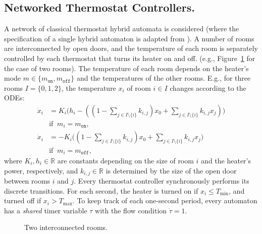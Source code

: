 \subsection{Networked Thermostat Controllers.}

A network of classical thermostat hybrid automata is considered 
(where the specification of a single hybrid automaton is adapted from \cite{henzinger2000theory}). 
A number of rooms are interconnected by open doors,
and the temperature of each room is separately controlled by each thermostat
that turns its heater on and off.
(e.g., Figure~\ref{fig:adj-rooms}  for the case of two rooms).
The temperature of each room depends on
the heater's mode $m \in \{m_\texttt{on}, m_\texttt{off}\}$  and the temperatures of the other rooms.
E.g., for three rooms $I = \{0,1,2\}$, 
the temperature $x_i$ of room $i \in I$
changes according to the ODEs:
\[
\begin{aligned}
\dot{x}_i &= K_i \big(h_i - ((1- \textstyle\sum_{j \in I \setminus \{i\}} k_{i,j}) x_0 + \sum_{j \in I \setminus \{i\}} k_{i,j}  x_j)\big)
\\ 
&\mbox{if}\;\; m_i = m_\texttt{on},
\\
\dot{x}_i &= - K_i \big((1- \textstyle\sum_{j \in I \setminus \{i\}} k_{i,j}) x_0 + \sum_{j \in I \setminus \{i\}} k_{i,j}  x_j\big)
\\
& \mbox{if}\;\; m_i = m_\texttt{off},
\end{aligned}
\]
where $K_i, h_i \in \mathbb{R}$ are constants depending on
the size of room $i$ and the heater's power, respectively,
and $k_{i,j} \in \mathbb{R}$ is determined by the size of the open door between rooms $i$ and $j$.
%
Every thermostat controller synchronously performs its discrete transitions.
For each second, 
the heater is turned on if $x_i \leq T_{\min}$,
and turned off if $x_i > T_{\max}$.
To keep track of each one-second period,
every automaton has a \emph{shared} timer variable $\tau$ 
with the flow condition $\dot{\tau} = 1$.

\begin{figure}
\centering
{}
\caption{Two interconnected rooms. %
} \label{fig:adj-rooms}
\end{figure}

